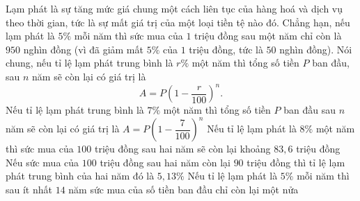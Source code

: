\begin{ex}%
	Lạm phát là sự tăng mức giá chung một cách liên tục của hàng hoá và dịch vụ theo thời gian, tức là sự mất giá trị của một loại tiền tệ nào đó. Chẳng hạn, nếu lạm phát là $5\%$ mỗi năm thì sức mua của $1$ triệu đồng sau một năm chỉ còn là $950$ nghìn đồng (vì đã giảm  mất $5\%$ của $1$ triệu đồng, tức là $50$ nghìn đồng). Nói chung, nếu tỉ lệ lạm phát trung bình là $r\%$ một năm thì tổng số tiền $P$ ban đầu, sau $n$ năm sẽ còn lại có giá trị là
	\[ 
	A = P\left(1 - \dfrac{r}{100}\right)^n. 
	\] 
	 \choiceTF
		{\True Nếu tỉ lệ lạm phát trung bình là $7\%$ một năm thì tổng số tiền $P$ ban đầu sau $n$ năm sẽ còn lại có giá trị  là $A = P\left(1 - \dfrac{7}{100}\right)^n$}
		{Nếu tỉ lệ lạm phát là $8\%$ một năm thì sức mua của $100$ triệu  đồng sau hai năm sẽ còn lại khoảng $83{,}6$ triệu đồng}
		{\True Nếu sức mua của $100$ triệu đồng sau hai năm còn lại $90$ triệu đồng thì tỉ lệ lạm phát trung bình  của hai năm đó là $5{,}13\%$}
		{Nếu tỉ lệ lạm phát là $5\%$ mỗi năm thì sau ít nhất $14$ năm sức mua của số  tiền ban đầu chỉ còn lại một nửa}
\end{ex}

